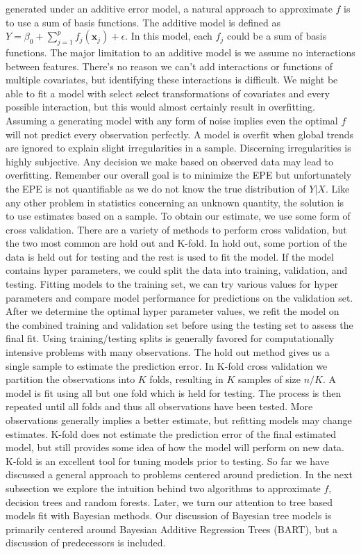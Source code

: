 \documentclass[
  12pt,
  letterpaper,
  DIV=11,
  numbers=noendperiod]{scrartcl}
\newcommand{\bm}{\mathbf}
\begin{document}
generated under an additive error model, a natural approach to
approximate \(f\) is to use a sum of basis functions. The additive model
is defined as \(Y=\beta_0+\sum_{j=1}^pf_j(\bm x_j)+\epsilon\). In this
model, each \(f_j\) could be a sum of basis functions. The major
limitation to an additive model is we assume no interactions between
features. There's no reason we can't add interactions or functions of
multiple covariates, but identifying these interactions is difficult. We
might be able to fit a model with select select transformations of
covariates and every possible interaction, but this would almost
certainly result in overfitting. Assuming a generating model with any
form of noise implies even the optimal \(f\) will not predict every
observation perfectly. A model is overfit when global trends are ignored
to explain slight irregularities in a sample. Discerning irregularities
is highly subjective. Any decision we make based on observed data may
lead to overfitting. Remember our overall goal is to minimize the EPE
but unfortunately the EPE is not quantifiable as we do not know the true
distribution of \(Y|X\). Like any other problem in statistics concerning
an unknown quantity, the solution is to use estimates based on a sample.
To obtain our estimate, we use some form of cross validation. There are
a variety of methods to perform cross validation, but the two most
common are hold out and K-fold. In hold out, some portion of the data is
held out for testing and the rest is used to fit the model. If the model
contains hyper parameters, we could split the data into training,
validation, and testing. Fitting models to the training set, we can try
various values for hyper parameters and compare model performance for
predictions on the validation set. After we determine the optimal hyper
parameter values, we refit the model on the combined training and
validation set before using the testing set to assess the final fit.
Using training/testing splits is generally favored for computationally
intensive problems with many observations. The hold out method gives us
a single sample to estimate the prediction error. In K-fold cross
validation we partition the observations into \(K\) folds, resulting in
\(K\) samples of size \(n/K\). A model is fit using all but one fold
which is held for testing. The process is then repeated until all folds
and thus all observations have been tested. More observations generally
implies a better estimate, but refitting models may change estimates.
K-fold does not estimate the prediction error of the final estimated
model, but still provides some idea of how the model will perform on new
data. K-fold is an excellent tool for tuning models prior to testing. So
far we have discussed a general approach to problems centered around
prediction. In the next subsection we explore the intuition behind two
algorithms to approximate \(f\), decision trees and random forests.
Later, we turn our attention to tree based models fit with Bayesian
methods. Our discussion of Bayesian tree models is primarily centered
around Bayesian Additive Regression Trees (BART), but a discussion of
predecessors is included.
\end{document}
